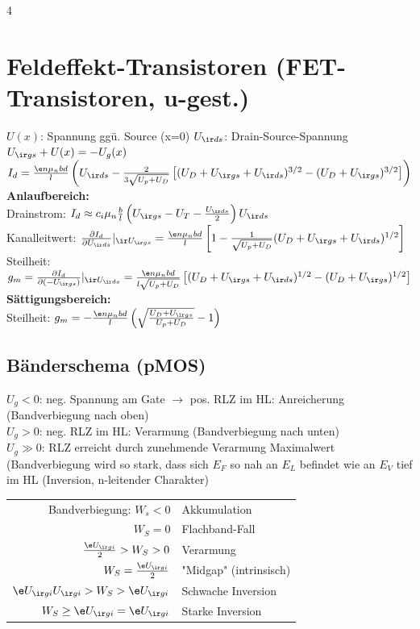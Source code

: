 \documentclass[fs, footer]{latex4ei_custom}
\begin{document}
\begin{multicols*}{4}
	\section{Feldeffekt-Transistoren (FET-Transistoren, u-gest.)}
	$U(x)$: Spannung ggü. Source (x=0) \quad $U_{\ir ds}$: Drain-Source-Spannung\\
	$U_{\ir gs} + U(x) = - U_g(x)$\\
	$I_d = \frac{\e n\mu_nbd}{l}\left(U_{\ir ds}-\frac{2}{3\sqrt{U_p+U_D}}\left[(U_D+U_{\ir gs}+U_{\ir ds})^{3/2}-(U_D+U_{\ir gs})^{3/2}\right]\right)$\\
	\textbf{Anlaufbereich:}\\
	Drainstrom: $I_d \approx c_i\mu_n\frac{b}{l}\left(U_{\ir gs}-U_T-\frac{U_{\ir ds}}{2}\right)U_{\ir ds}$\\
	Kanalleitwert: $\frac{\partial I_d}{\partial U_{\ir ds}}|_{\ir U_{\ir gs}} = \frac{\e n\mu_nbd}{l}\left[1-\frac{1}{\sqrt{U_p+U_D}}(U_D+U_{\ir gs}+U_{\ir ds})^{1/2}\right]$\\
	Steilheit: $g_m =\frac{\partial I_d}{\partial (-U_{\ir gs})}|_{\ir U_{\ir ds}} =  \frac{\e n\mu_nbd}{l\sqrt{U_p+U_D}}\left[(U_D+U_{\ir gs}+U_{\ir ds})^{1/2}-(U_D+U_{\ir gs})^{1/2}\right]$\\
	\textbf{Sättigungsbereich:}\\
	Steilheit: $g_m = -\frac{\e n\mu_nbd}{l}\left(\sqrt{\frac{U_D+U_{\ir gs}}{U_p+U_D}}-1\right)$
	\subsection{Bänderschema (pMOS)}
	$U_g<0$: neg. Spannung am Gate $\rightarrow$ pos. RLZ im HL: Anreicherung (Bandverbiegung nach oben)\\
	$U_g>0$: neg. RLZ im HL: Verarmung (Bandverbiegung nach unten)\\
	$U_g\gg 0$: RLZ erreicht durch zunehmende Verarmung Maximalwert (Bandverbiegung wird so stark, dass sich $E_F$ so nah an $E_L$ befindet wie an $E_V$ tief im HL (Inversion, n-leitender Charakter)\\
	\begin{tabular}{r|l}
		Bandverbiegung: $W_s<0$                     & Akkumulation           \\
		$W_S=0$                                     & Flachband-Fall         \\
		$\frac{\e U_{\ir gi}}{2}>W_S>0$             & Verarmung              \\
		$W_S=\frac{\e U_{\ir gi}}{2}$               & "Midgap" (intrinsisch) \\
		$\e U_{\ir gi}U_{\ir gi}>W_S>\e U_{\ir gi}$ & Schwache Inversion     \\
		$W_S\geq \e U_{\ir gi}=\e U_{\ir gi}$       & Starke Inversion       \\
	\end{tabular}

\end{multicols*}
\end{document}
